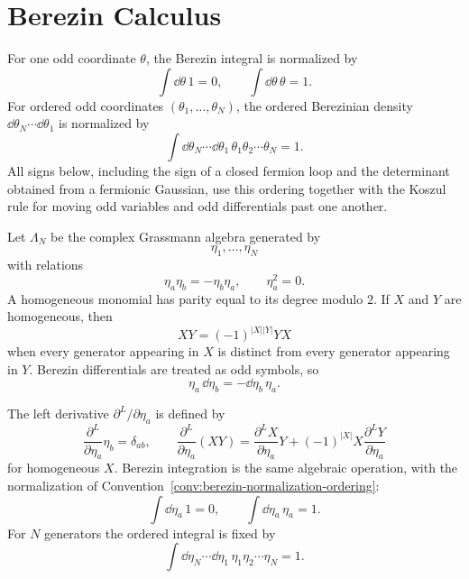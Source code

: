 \section{Berezin Calculus}

\begin{convention}
\label{conv:berezin-normalization-ordering}
For one odd coordinate \(\theta\), the Berezin integral is normalized by
\[
  \int\dd\theta\,1=0,
  \qquad
  \int\dd\theta\,\theta=1.
\]
For ordered odd coordinates \((\theta_1,\ldots,\theta_N)\), the ordered
Berezinian density \(\dd\theta_N\cdots\dd\theta_1\) is normalized by
\[
  \int\dd\theta_N\cdots\dd\theta_1\,
  \theta_1\theta_2\cdots\theta_N
  =
  1.
\]
All signs below, including the sign of a closed fermion loop and the determinant
obtained from a fermionic Gaussian, use this ordering together with the Koszul
rule for moving odd variables and odd differentials past one another.
\end{convention}

\begin{definition}
\label{def:finite-grassmann-algebra-berezin-derivative}
Let \(\Lambda_N\) be the complex Grassmann algebra generated by
\[
  \eta_1,\ldots,\eta_N
\]
with relations
\[
  \eta_a\eta_b=-\eta_b\eta_a,
  \qquad
  \eta_a^2=0.
\]
A homogeneous monomial has parity equal to its degree modulo \(2\). If \(X\)
and \(Y\) are homogeneous, then
\[
  XY=(-1)^{|X||Y|}YX
\]
when every generator appearing in \(X\) is distinct from every generator
appearing in \(Y\). Berezin differentials are treated as odd symbols, so
\[
  \eta_a\,\dd\eta_b=-\dd\eta_b\,\eta_a .
\]

The left derivative \(\partial^L/\partial\eta_a\) is defined by
\[
  \frac{\partial^L}{\partial\eta_a}\eta_b=\delta_{ab},
  \qquad
  \frac{\partial^L}{\partial\eta_a}(XY)
  =
  \frac{\partial^L X}{\partial\eta_a}Y
  +
  (-1)^{|X|}X\frac{\partial^L Y}{\partial\eta_a}
\]
for homogeneous \(X\). Berezin integration is the same algebraic operation, with
the normalization of Convention~\ref{conv:berezin-normalization-ordering}:
\[
  \int\dd\eta_a\,1=0,
  \qquad
  \int\dd\eta_a\,\eta_a=1.
\]
For \(N\) generators the ordered integral is fixed by
\[
  \int\dd\eta_N\cdots\dd\eta_1\,
  \eta_1\eta_2\cdots\eta_N
  =
  1.
\]
\end{definition}

